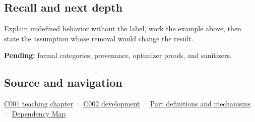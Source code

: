 \subsection{Recall and next depth}\label{appendix-f558f5b4d8f2-recall-and-next-depth}

Explain undefined behavior without the label, work the example above, then state the assumption whose removal would change the result.

\textbf{Pending:} formal categories, provenance, optimizer proofs, and sanitizers.

\subsection{Source and navigation}\label{appendix-f558f5b4d8f2-source-and-navigation}

\hyperref[01-foundations-i-ch001-from-a-signal-to-an-interpretation]{C001 teaching chapter} · \hyperref[01-foundations-i-ch001-arithmetic-becomes-a-policy]{C002 development} · \hyperref[appendix-fd090d982a15]{Part definitions and mechanisms} · \hyperref[appendix-4ad47bdd269a]{Dependency Map}

